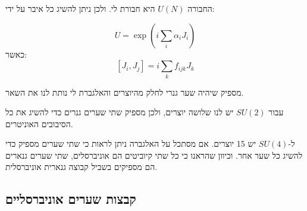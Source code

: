 \documentclass{tstextbook}
\begin{document}
\begin{reminder}
החבורה \(U(N)\) היא חבורת לי. ולכן ניתן להשיג כל איבר על ידי:

$$U=\exp\left(i{\sum_{i}}\alpha_{i}J_{i}\right)$$
כאשר:
$$[J_{i},J_{j}]=i\sum_{k}f_{i j k}J_{k}$$

\end{reminder}
\begin{corollary}
מספיק שיהיה שער גנרי לחלק מהיוצרים והאלגברת לי נותת לנו את השאר.

\end{corollary}
\begin{corollary}
עבור \(SU(2)\) יש לנו שלושה יוצרים, ולכן מספיק שתי שערים גנרים כדי להשיג את כל הסיבובים האוניטרים.

\end{corollary}
\begin{corollary}
ל-\(SU(4)\) יש 15 יוצרים. אם מסתכל על האלגברה ניתן לראות כי שתי שערים מספיק כדי להשיג כל שער אחר. וכיוון שהראנו כי כל שתי קיוביטים הם אוניברסלים, שתי שערים גנארים הם מספיקים בשביל קבוצה גנארית אוניברסלית.

\end{corollary}
\subsection{קבצות שערים אוניברסליים}
\end{document}
